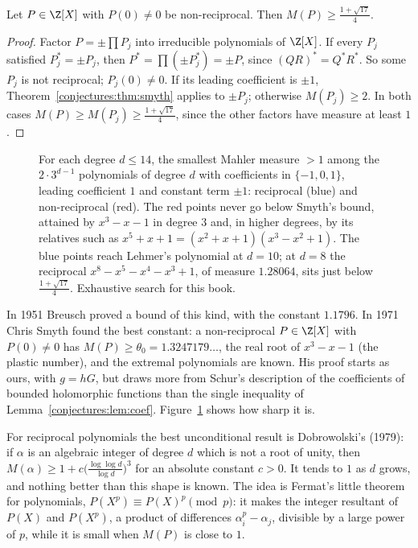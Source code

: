 \begin{corollary}\label{conjectures:cor:nonrec}
Let $P\in\Z[X]$ with $P(0)\ne0$ be non-reciprocal. Then $M(P)\ge\frac{1+\sqrt{17}}4$.
\end{corollary}
\begin{proof}
Factor $P=\pm\prod P_j$ into irreducible polynomials of $\Z[X]$. If every $P_j$ satisfied $P_j^*=\pm P_j$, then $P^*=\prod(\pm P_j^*)=\pm P$, since
$(QR)^*=Q^*R^*$. So some $P_j$ is not reciprocal; $P_j(0)\ne0$. If its leading coefficient is $\pm1$, Theorem~\ref{conjectures:thm:smyth} applies to $\pm P_j$; otherwise
$M(P_j)\ge2$. In both cases $M(P)\ge M(P_j)\ge\frac{1+\sqrt{17}}4$, since the other factors have measure at least $1$.
\end{proof}

\begin{figure}[ht]
\centering
{}
\caption{For each degree $d\le14$, the smallest Mahler measure $>1$ among the $2\cdot3^{d-1}$ polynomials of degree $d$ with coefficients in
$\{-1,0,1\}$, leading coefficient $1$ and constant term $\pm1$: reciprocal (blue) and non-reciprocal (red). The red points never go below Smyth's bound,
attained by $x^3-x-1$ in degree $3$ and, in higher degrees, by its relatives such as $x^5+x+1=(x^2+x+1)(x^3-x^2+1)$. The blue points reach Lehmer's polynomial at $d=10$; at $d=8$ the reciprocal
$x^8-x^5-x^4-x^3+1$, of measure $1.28064$, sits just below $\frac{1+\sqrt{17}}4$. Exhaustive search for this book.}
\label{conjectures:fig:mahler}
\end{figure}

\begin{remark}\label{conjectures:rem:smythsharp}
In 1951 Breusch proved a bound of this kind, with the constant $1.1796$. In 1971 Chris Smyth found the best constant: a non-reciprocal $P\in\Z[X]$ with $P(0)\ne0$
has $M(P)\ge\theta_0=1.3247179\ldots$, the real root of $x^3-x-1$ (the plastic number), and the extremal polynomials are known. His proof starts as ours,
with $g=hG$, but draws more from Schur's description of the coefficients of bounded holomorphic functions than the single inequality of
Lemma~\ref{conjectures:lem:coef}. Figure~\ref{conjectures:fig:mahler} shows how sharp it is.
\end{remark}

\begin{remark}\label{conjectures:rem:dobrowolski}
For reciprocal polynomials the best unconditional result is Dobrowolski's (1979): if $\alpha$ is an algebraic integer of degree $d$ which is not a root of
unity, then $M(\alpha)\ge1+c\bigl(\frac{\log\log d}{\log d}\bigr)^3$ for an absolute constant $c>0$. It tends to $1$ as $d$ grows, and nothing better than
this shape is known. The idea is Fermat's little theorem for polynomials, $P(X^p)\equiv P(X)^p\pmod p$: it makes the integer resultant of $P(X)$ and $P(X^p)$,
a product of differences $\alpha_i^p-\alpha_j$, divisible by a large power of $p$, while it is small when $M(P)$ is close to $1$.
\end{remark}

